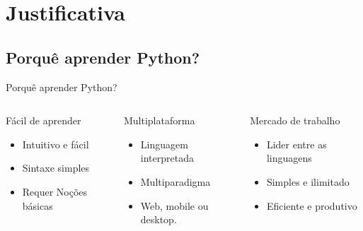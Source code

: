 
\section{Justificativa}
\subsection{Porquê aprender Python?}
	\begin{frame}{Porquê aprender Python?}
		\begin{columns}
			
				\centering
				\begin{block}{\centering Fácil de aprender}
					\justifying
					\tiny 
					
					\begin{itemize}
						\item Intuitivo e fácil
						\item Sintaxe simples
						\item Requer Noções básicas
					\end{itemize}
					
					 
				\end{block}
				
				\pause
				
				\begin{block}{\centering Multiplataforma}
					
					\justifying
					\tiny 
					
					\begin{itemize}
						\item Linguagem interpretada
						\item Multiparadigma
						\item Web, mobile ou desktop.
					\end{itemize}
					
				\end{block}
			
				\pause
				\begin{block}{\centering Mercado de trabalho}
					
					\justifying
					\tiny
					
					\begin{itemize}
						\item Lider entre as linguagens
						\item Simples e ilimitado
						\item Eficiente e produtivo
					\end{itemize}
					
				\end{block}
					
		\end{columns}
	\end{frame}


